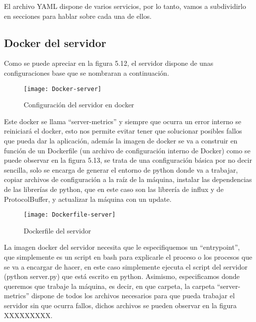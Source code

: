 \documentclass[ spanish, a4paper, 12pt, oneside]{report}
\begin{document}
El archivo YAML dispone de varios servicios, por lo tanto, vamos a subdividirlo en secciones para hablar sobre cada una de ellos. \\

\subsection{Docker del servidor}

Como se puede apreciar en la figura 5.12, el servidor dispone de unas configuraciones base que se nombraran a continuación.\\

\begin{figure}[!h]
   \centering
   \texttt{[image: Docker-server]}\\
      \caption{\label{fig: Configuración del servidor en docker} Configuración del servidor en docker}
\end{figure}

Este docker se llama ``server-metrics'' y siempre que ocurra un error interno se reiniciará el docker, esto nos permite evitar 
tener que solucionar posibles fallos que pueda dar la aplicación, además la imagen de docker se va a construir en función de un Dockerfile (un archivo de configuración interno de Docker) como se puede observar en la figura 5.13, se trata de una configuración básica 
por no decir sencilla, solo se encarga de generar el entorno de python donde va a trabajar, copiar archivos de configuración a la raíz de la máquina, instalar las dependencias de las librerías de python, que en este caso son las librería de influx y de ProtocolBuffer, y actualizar 
la máquina con un update. \\ 

\begin{figure}[!h]
   \centering
   \texttt{[image: Dockerfile-server]}\\
      \caption{\label{fig: Dockerfile del servidor} Dockerfile del servidor}
\end{figure}

La imagen docker del servidor necesita que le especifiquemos un ``entrypoint'', que simplemente es un script en bash para explicarle el proceso o los procesos que se va a encargar de hacer, en este caso simplemente ejecuta el script del servidor (python server.py) que está 
escrito en python. Asimismo, especificamos donde queremos que trabaje la máquina, es decir, en que carpeta, la carpeta ``server-metrics'' dispone de todos los archivos necesarios para que pueda trabajar el servidor sin que ocurra fallos, dichos archivos se pueden observar en la figura XXXXXXXXX.\\
\end{document}
